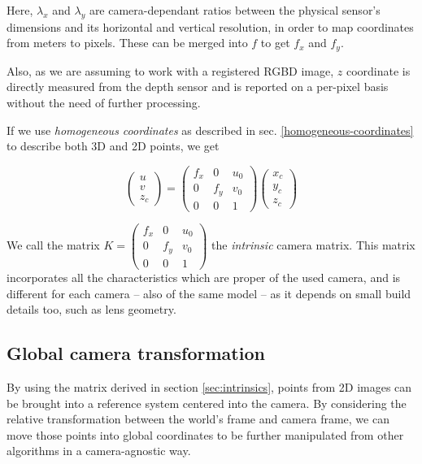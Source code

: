 Here, $\lambda _x$ and $\lambda _y$ are camera-dependant ratios between the
physical sensor's dimensions and its horizontal and vertical resolution, in
order to map coordinates from meters to pixels. These can be merged into $f$ to
get $f_x$ and $f_y$.

Also, as we are assuming to work with a registered RGBD image, $z$ coordinate is
directly measured from the depth sensor and is reported on a per-pixel basis
without the need of further processing.

If we use \emph{homogeneous coordinates} as described in sec.
\ref{homogeneous-coordinates}
to describe both 3D and 2D points, we get

\begin{equation} \label{eqn:intrinsics}
\left(\begin{array}{c}u\\v\\z_c\end{array}\right)
  =
  \left(\begin{array}{cccc}
      f_x & 0 & u_0 \\
      0 & f_y & v_0 \\
      0 & 0   & 1 
  \end{array}\right)
\left(\begin{array}{c}x_c\\y_c\\z_c\end{array}\right)
\end{equation}

We call the matrix 
$K=
  \left(\begin{array}{cccc}
      f_x & 0 & u_0 \\
      0 & f_y & v_0 \\
      0 & 0   & 1 
\end{array}\right)$
the \emph{intrinsic} camera matrix. This matrix incorporates all the
characteristics which are proper of the used camera, and is different for each
camera -- also of the same model -- as it depends on small build details too,
such as lens geometry.

\subsection{Global camera transformation}
By using the matrix derived in section \ref{sec:intrinsics}, points from 2D
images can be brought into a reference system centered into the camera.
By considering the relative transformation between the world's frame and camera
frame, we can move those points into global coordinates to be further
manipulated from other algorithms in a camera-agnostic way.

